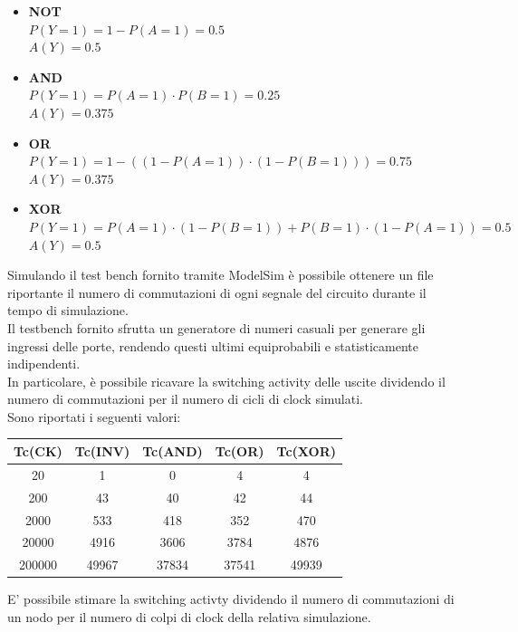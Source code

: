 \documentclass[10pt,  english, makeidx, a4paper, titlepage, oneside]{book}
\begin{document}
\begin{itemize}
	\item \textbf{NOT} \\
	$P(Y=1) = 1 - P(A=1) = 0.5$ \\
	$A(Y) = 0.5$
	\item \textbf{AND} \\
	$P(Y=1) = P(A=1) \cdot P(B=1) = 0.25$ \\
	$A(Y) = 0.375$
	\item \textbf{OR} \\
	$P(Y=1) = 1-((1-P(A=1)) \cdot(1-P(B=1))) = 0.75$ \\
	$A(Y) = 0.375$
	\item \textbf{XOR} \\
	$P(Y=1) = P(A=1) \cdot(1-P(B=1)) + P(B=1) \cdot(1-P(A=1)) = 0.5$ \\
	$A(Y) = 0.5$ 
\end{itemize} 
Simulando il test bench fornito tramite ModelSim è possibile ottenere un file 
riportante il numero di commutazioni di ogni segnale del circuito durante il 
tempo di simulazione.
\\
Il testbench fornito sfrutta un generatore di numeri casuali per generare gli 
ingressi delle porte, rendendo questi ultimi equiprobabili e statisticamente 
indipendenti.
\\
In particolare, è possibile ricavare la switching activity delle uscite dividendo 
il numero di commutazioni per il numero di cicli di clock simulati.
\\
Sono riportati i seguenti valori:
\\
\begin{center}
	\begin{tabular}{|c|c|c|c|c|} %
 	\hline %
 	Tc(CK) & Tc(INV) & Tc(AND) & Tc(OR) & Tc(XOR) \\ 
 	\hline
 	20 & 1 & 0 & 4 & 4 \\ 
 	\hline
 	200 & 43 & 40 & 42 & 44 \\ 
 	\hline
 	2000 & 533 & 418 & 352 & 470 \\
 	\hline
 	20000 & 4916 & 3606 & 3784 & 4876 \\
 	\hline
 	200000 & 49967 & 37834 & 37541 & 49939 \\
 	\hline
	\end{tabular}
\end{center}
E' possibile stimare la switching activty dividendo il numero 
di commutazioni di un nodo per il numero di colpi di clock della
relativa simulazione.
\\
\end{document}
